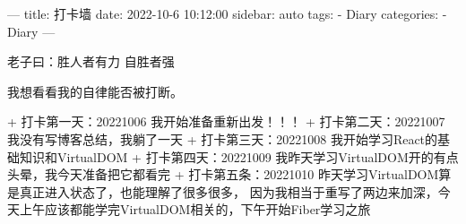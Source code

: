 ---
title: 打卡墙
date: 2022-10-6 10:12:00
sidebar: auto
tags:
 - Diary
categories:
 -  Diary
---

老子曰：胜人者有力 自胜者强

我想看看我的自律能否被打断。

+ 打卡第一天：20221006 我开始准备重新出发！！！
+ 打卡第二天：20221007 我没有写博客总结，我躺了一天
+ 打卡第三天：20221008 我开始学习React的基础知识和VirtualDOM
+ 打卡第四天：20221009 我昨天学习VirtualDOM开的有点头晕，我今天准备把它都看完
+ 打卡第五条：20221010 昨天学习VirtualDOM算是真正进入状态了，也能理解了很多很多，
  因为我相当于重写了两边来加深，今天上午应该都能学完VirtualDOM相关的，下午开始Fiber学习之旅



